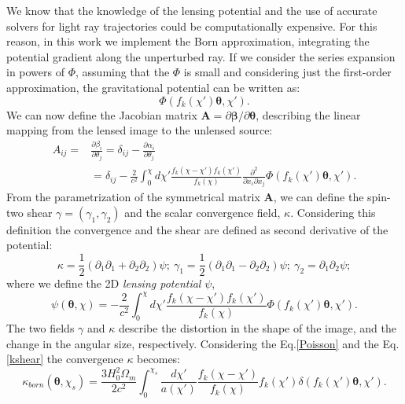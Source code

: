 \documentclass[twocolumn,twocolappendix]{aastex63}
\begin{document}
We know that the knowledge of the lensing potential and the use of accurate solvers for light ray trajectories could be computationally expensive.
For this reason, in this work we implement the Born approximation, integrating the potential gradient along the unperturbed ray. If we consider the series expansion in powers of $\Phi$, assuming that the $\Phi$ is small and considering just the first-order approximation, the gravitational potential  can be written as:
\begin{equation}
    \Phi(f_k(\chi')\boldsymbol{\theta},\chi').
\end{equation}
We can now define the Jacobian matrix \textbf{A}$=\partial\boldsymbol{\beta}/\partial\boldsymbol{\theta}$, describing the linear mapping from the lensed image to the unlensed source:
\begin{align}
    A_{ij}=& \frac{\partial\beta_i}{\partial\theta_j}=
    \delta_{ij}-\frac{\partial\alpha_i}{\partial\theta_j} \\
     & =\delta_{ij}-\frac{2}{c^2}
    \int_0^{\chi} d\chi'
     \frac{f_k(\chi-\chi')f_k(\chi')}{f_k(\chi)}
     \frac{\partial^2}{\partial x_i \partial x_j} \Phi(f_k(\chi')\boldsymbol{\theta},\chi').
\end{align}
From the parametrization of the symmetrical matrix \textbf{A}, we can define the spin-two shear $\gamma=(\gamma_1,\gamma_2)$ and the scalar convergence field, $\kappa$. 
Considering this definition the convergence and the shear are defined as second derivative of the potential:
\begin{equation}\label{kshear}
    \kappa=\frac{1}{2}(\partial_1\partial_1+\partial_2\partial_2)\psi; \ \gamma_1=\frac{1}{2}(\partial_1\partial_1-\partial_2\partial_2)\psi; \ 
    \gamma_2=\partial_1\partial_2\psi;
\end{equation}
where we define the 2D \textit{lensing potential} $\psi$,
\begin{equation}
    \psi(\boldsymbol{\theta},\chi)=
    -\frac{2}{c^2}
    \int_0^{\chi} d\chi'
     \frac{f_k(\chi-\chi')f_k(\chi')}{f_k(\chi)}
    \Phi(f_k(\chi')\boldsymbol{\theta},\chi').
\end{equation}
The two fields $\gamma$ and $\kappa$ describe the distortion in the shape of the image, and the change in the angular size, respectively.
Considering the Eq.\ref{Poisson} and the Eq.\ref{kshear} the convergence $\kappa$ becomes:
\begin{equation}
    \kappa_{born}(\boldsymbol{\theta},\chi_s)= \frac{3H_0^2 \Omega_m}{2c^2}
    \int_0^{\chi_s} 
    \frac{d\chi'}{a(\chi')}
     \frac{f_k(\chi-\chi')}{f_k(\chi)}
     f_k(\chi')
    \delta(f_k(\chi')\boldsymbol{\theta},\chi').
\end{equation}
\end{document}
